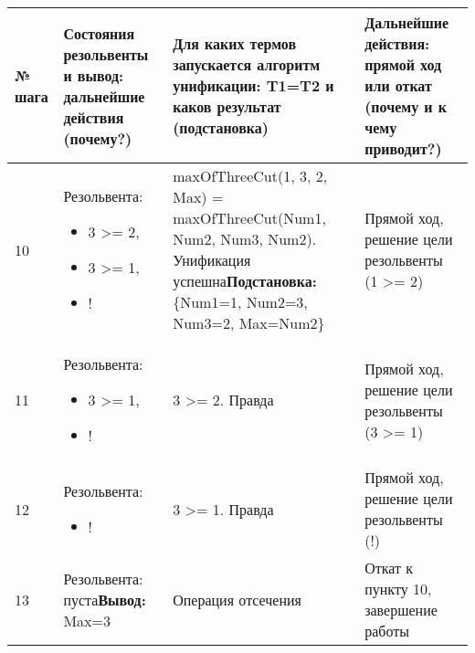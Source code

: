 \documentclass[14pt,a4paper]{scrreprt}
\begin{document}
\begin{table}[H]
	\begin{tabular}{|p{0.8cm\small}|p{4.7cm\small}|p{5.7cm\small}|p{4cm\small}|}	
		\hline
		№ шага & Состояния резольвенты и вывод: дальнейшие действия (почему?) & Для каких термов запускается алгоритм унификации: T1=T2 и каков результат (подстановка) & Дальнейшие действия: прямой ход или откат (почему и к чему приводит?)\\
		\hline
		10 & Резольвента:\begin{itemize}\item 3 >= 2, \item 3 >= 1, \item ! \end{itemize} & maxOfThreeCut(1, 3, 2, Max) = maxOfThreeCut(Num1, Num2, Num3, Num2). Унификация успешна\linebreak \textbf{Подстановка:} \{Num1=1, Num2=3, Num3=2, Max=Num2\}& Прямой ход, решение цели резольвенты (1 >= 2)\\
		\hline
		11 & Резольвента:\begin{itemize}\item 3 >= 1, \item ! \end{itemize} & 3 >= 2. Правда & Прямой ход, решение цели резольвенты (3 >= 1)\\
		\hline
		12 & Резольвента:\begin{itemize}\item ! \end{itemize} & 3 >= 1. Правда & Прямой ход, решение цели резольвенты (!)\\
		\hline
		13 & Резольвента: пуста\linebreak \textbf{Вывод:} Max=3 & Операция отсечения & Откат к пункту 10, завершение работы\\
		\hline
	\end{tabular}
\end{table}
		
\end{document}
